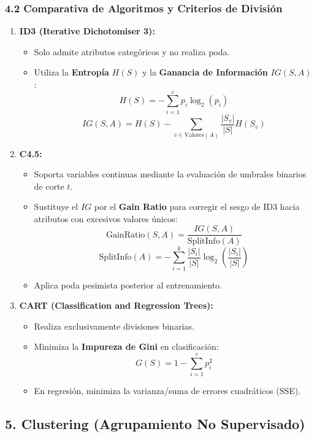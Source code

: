 \subsubsection{4.2 Comparativa de Algoritmos y Criterios de División}

\begin{enumerate}
	\item \textbf{ID3 (Iterative Dichotomiser 3):}
	\begin{itemize}
		\item Solo admite atributos categóricos y no realiza poda.
		\item Utiliza la \textbf{Entropía} $H(S)$ y la \textbf{Ganancia de Información} $IG(S, A)$:
		$$H(S) = - \sum_{i=1}^{c} p_i \log_2(p_i)$$
		$$IG(S, A) = H(S) - \sum_{v \in \text{Valores}(A)} \frac{|S_v|}{|S|} H(S_v)$$
	\end{itemize}
	
	\item \textbf{C4.5:}
	\begin{itemize}
		\item Soporta variables continuas mediante la evaluación de umbrales binarios de corte $t$.
		\item Sustituye el $IG$ por el \textbf{Gain Ratio} para corregir el sesgo de ID3 hacia atributos con excesivos valores únicos:
		$$\text{GainRatio}(S, A) = \frac{IG(S, A)}{\text{SplitInfo}(A)}$$
		$$\text{SplitInfo}(A) = -\sum_{i=1}^{k} \frac{|S_i|}{|S|} \log_2\left(\frac{|S_i|}{|S|}\right)$$
		\item Aplica poda pesimista posterior al entrenamiento.
	\end{itemize}
	
	\item \textbf{CART (Classification and Regression Trees):}
	\begin{itemize}
		\item Realiza exclusivamente divisiones binarias.
		\item Minimiza la \textbf{Impureza de Gini} en clasificación:
		$$G(S) = 1 - \sum_{i=1}^{c} p_i^2$$
		\item En regresión, minimiza la varianza/suma de errores cuadráticos (SSE).
	\end{itemize}
\end{enumerate}

\subsection{5. Clustering (Agrupamiento No Supervisado)}


